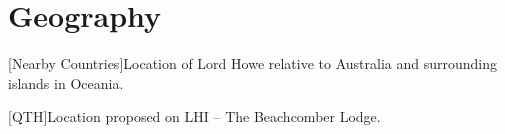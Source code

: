 \documentclass[11pt]{article}
\begin{document}
\section{Geography}

\vskip2mm
\noindent%
\begin{minipage}{\linewidth}%
\captionsetup{width=0.8\linewidth}
[Nearby Countries]{Location of Lord Howe relative to Australia and surrounding
islands in Oceania.}
\label{location-relative}
\end{minipage}
\vskip3mm

\noindent%
\begin{minipage}{\linewidth}%
\captionsetup{width=0.8\linewidth}
[QTH]{Location proposed on LHI -- The Beachcomber Lodge.}
\label{location-relative-qth}
\end{minipage}
\vskip3mm
\end{document}
